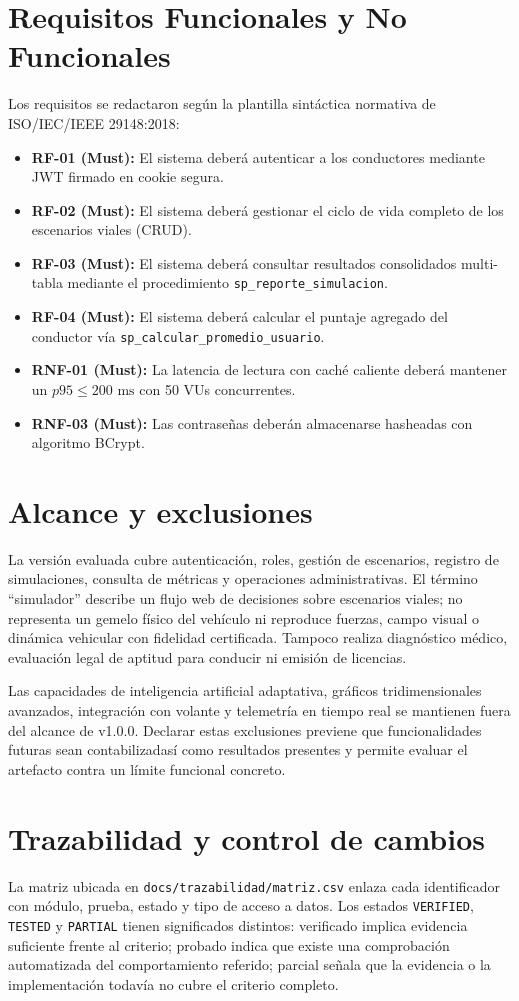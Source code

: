 \documentclass[11pt,a4paper]{report}
\begin{document}
\section{Requisitos Funcionales y No Funcionales}
Los requisitos se redactaron según la plantilla sintáctica normativa de ISO/IEC/IEEE 29148:2018:
\begin{itemize}
    \item \textbf{RF-01 (Must):} El sistema deberá autenticar a los conductores mediante JWT firmado en cookie segura.
    \item \textbf{RF-02 (Must):} El sistema deberá gestionar el ciclo de vida completo de los escenarios viales (CRUD).
    \item \textbf{RF-03 (Must):} El sistema deberá consultar resultados consolidados multi-tabla mediante el procedimiento \texttt{sp\_reporte\_simulacion}.
    \item \textbf{RF-04 (Must):} El sistema deberá calcular el puntaje agregado del conductor vía \texttt{sp\_calcular\_promedio\_usuario}.
    \item \textbf{RNF-01 (Must):} La latencia de lectura con caché caliente deberá mantener un $p95 \le 200\text{ ms}$ con 50 VUs concurrentes.
    \item \textbf{RNF-03 (Must):} Las contraseñas deberán almacenarse hasheadas con algoritmo BCrypt.
\end{itemize}

\section{Alcance y exclusiones}
La versión evaluada cubre autenticación, roles, gestión de escenarios, registro de simulaciones, consulta de métricas y operaciones administrativas. El término ``simulador'' describe un flujo web de decisiones sobre escenarios viales; no representa un gemelo físico del vehículo ni reproduce fuerzas, campo visual o dinámica vehicular con fidelidad certificada. Tampoco realiza diagnóstico médico, evaluación legal de aptitud para conducir ni emisión de licencias.

Las capacidades de inteligencia artificial adaptativa, gráficos tridimensionales avanzados, integración con volante y telemetría en tiempo real se mantienen fuera del alcance de v1.0.0. Declarar estas exclusiones previene que funcionalidades futuras sean contabilizadasí como resultados presentes y permite evaluar el artefacto contra un límite funcional concreto.

\section{Trazabilidad y control de cambios}
La matriz ubicada en \texttt{docs/trazabilidad/matriz.csv} enlaza cada identificador con módulo, prueba, estado y tipo de acceso a datos. Los estados \texttt{VERIFIED}, \texttt{TESTED} y \texttt{PARTIAL} tienen significados distintos: verificado implica evidencia suficiente frente al criterio; probado indica que existe una comprobación automatizada del comportamiento referido; parcial señala que la evidencia o la implementación todavía no cubre el criterio completo.
\end{document}
